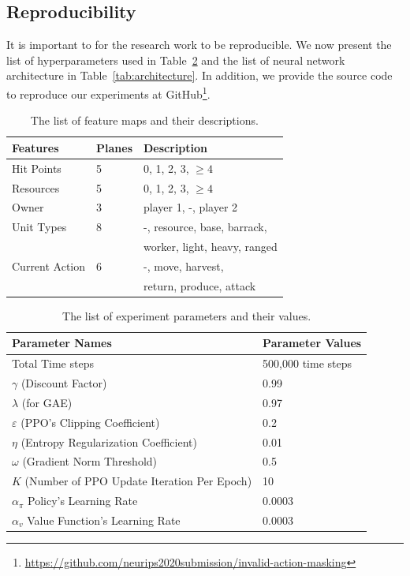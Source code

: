 \documentclass[letterpaper]{article}
\begin{document}
\subsection{Reproducibility}
It is important to for the research work to be reproducible. We now present the list of hyperparameters used in Table~\ref{tab:params} and the list of neural network architecture in  Table~\ref{tab:architecture}. In addition, we provide the source code to reproduce our experiments at GitHub\footnote{\url{https://github.com/neurips2020submission/invalid-action-masking}}.
\begin{table}[t]
\centering
\caption{The list of feature maps and their descriptions.}
\begin{tabular}{lll}
\toprule
Features  & Planes & Description \\
\midrule
Hit Points & 5 & 0, 1, 2, 3, $\geq 4$  \\
Resources & 5 & 0, 1, 2, 3, $\geq 4$  \\
Owner &3 & player 1, -, player 2 %
\\
Unit Types &8 & -, resource, base, barrack, \\
&&worker, light, heavy, ranged \\
Current Action &6& -, move, harvest, \\
&&return, produce, attack\\
\bottomrule
\end{tabular}
\label{tab:features}
\end{table}
\begin{table}[t]
\centering
\caption{The list of experiment parameters and their values.}
\begin{tabular}{ll}
\toprule
Parameter Names  & Parameter Values\\
\midrule
Total Time steps & 500,000 time steps \\
$\gamma$ (Discount Factor) & 0.99 \\
$\lambda$ (for GAE) & 0.97 \\
$\varepsilon$ (PPO's Clipping Coefficient) & 0.2 \\
$\eta$ (Entropy Regularization Coefficient) & 0.01 \\
$\omega$ (Gradient Norm Threshold)& 0.5 \\
$K$ (Number of PPO Update Iteration Per Epoch)& 10 \\
$\alpha_{\pi}$ Policy's Learning Rate &  0.0003 \\
$\alpha_{v}$ Value Function's Learning Rate &  0.0003 \\
\bottomrule
\end{tabular}
\label{tab:params}
\end{table}
\end{document}
